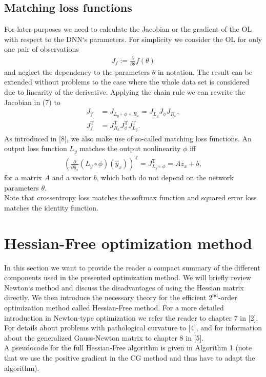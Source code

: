 \documentclass[conference]{IEEEtran}
\begin{document}
	\subsection{Matching loss functions}
	\noindent
	For later purposes we need to calculate the Jacobian or the gradient of the OL with respect to the DNN`s parameters. For simplicity we consider the OL for only one pair of observations
	\begin{align}
	J_{f} := \frac{\partial}{\partial\theta}f(\theta)
	\end{align}
	and neglect the dependency to the parameters $\theta$ in notation.
	The result can be extended without problems to the case where the whole data set is considered due to linearity of the derivative.
	Applying the chain rule we can rewrite the Jacobian in (7) to
	\begin{align}
	J_{f} &= J_{L_{y}\circ \:\phi \:\circ\:R_{x}} = J_{L_{y}} J_{\phi} J_{R_{x}},\\
	J_{f}^{\mathrm{T}} &= J_{R_{x}}^{\mathrm{T}}  J_{\phi}^{\mathrm{T}}  J_{L_{y}}^{\mathrm{T}}.
	\end{align}
	As introduced in [8], we also make use of so-called matching loss functions. An output loss function $L_{y}$ matches the output nonlinearity $\phi$ iff
	\begin{align}
	\left(\frac{\partial}{\partial\hat{y}_{x}}\left(L_{y}\circ \phi\right)(\hat{y}_{x})\right)^{\mathrm{T}}= J_{L_{y}\circ \:\phi}^{\mathrm{T}} = A z_{x} + b,
	\end{align}
	for a matrix $A$ and a vector $b$, which both do not depend on the network parameters $\theta$.\\
	Note that crossentropy loss matches the softmax function and squared error loss matches the identity function.
	
	
	\section{Hessian-Free optimization method}
	\noindent
	In this section we want to provide the reader a compact summary of the different components used in the presented optimization method. We will briefly review Newton`s method and discuss the disadvantages of using the Hessian matrix directly. We then introduce the necessary theory for the efficient $2^{\text{nd}}$-order optimization method called Hessian-Free method. For a more detailed introduction in Newton-type optimization we refer the reader to chapter 7 in [2]. For details about problems with pathological curvature to [4], and for information about the generalized Gauss-Newton matrix to chapter 8 in [5].\\
	A pseudocode for the full Hessian-Free algorithm is given in Algorithm 1 (note that we use the positive gradient in the CG method and thus have to adapt the algorithm).
	
\end{document}
